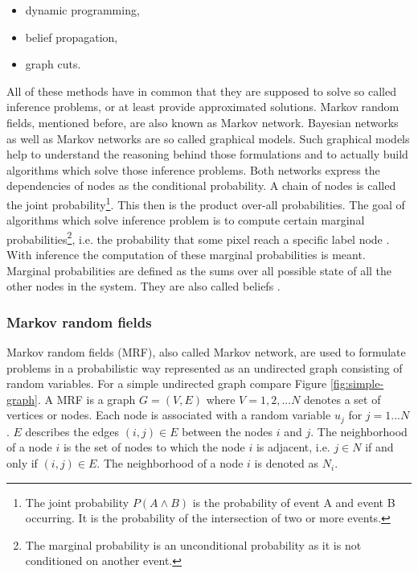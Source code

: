 \begin{itemize}
  \item dynamic programming,
  \item belief propagation,
  \item graph cuts.
\end{itemize}

\noindent All of these methods have in common that they are supposed to solve so called inference problems, or at least provide approximated solutions.
Markov random fields, mentioned before, are also known as Markov network.
Bayesian networks as well as Markov networks are so called graphical models.
Such graphical models help to understand the reasoning behind those formulations and to actually build algorithms which solve those inference problems.
Both networks express the dependencies of nodes as the conditional probability.
A chain of nodes is called the joint probability\footnote{The joint probability $P(A \land B)$ is the probability of event A and event B occurring. It is the probability of the intersection of two or more events.}.
This then is the product over-all probabilities.
The goal of algorithms which solve inference problem is to compute certain marginal probabilities\footnote{The marginal probability is an unconditional probability as it is not conditioned on another event.}, i.e. the probability that some pixel reach a specific label node \citep{cyganek2011introduction}.
With inference the computation of these marginal probabilities is meant.
Marginal probabilities are defined as the sums over all possible state of all the other nodes in the system.
They are also called beliefs \citep{yedidia2003understanding}.

\subsubsection{Markov random fields}

Markov random fields (MRF), also called Markov network, are used to formulate problems in a probabilistic way represented as an undirected graph consisting of random variables.
For a simple undirected graph compare Figure \ref{fig:simple-graph}.
\newline\newline\noindent A MRF is a graph $G = (V, E)$ where $V = {1,2,...N}$ denotes a set of vertices or nodes.
Each node is associated with a random variable $u_j$ for $j = 1...N$.
$E$ describes the edges $(i,j) \in E$ between the nodes $i$ and $j$.
The neighborhood of a node $i$ is the set of nodes to which the node $i$ is adjacent, i.e. $j \in N$ if and only if $(i,j) \in E$.
The neighborhood of a node $i$ is denoted as $N_i$.

